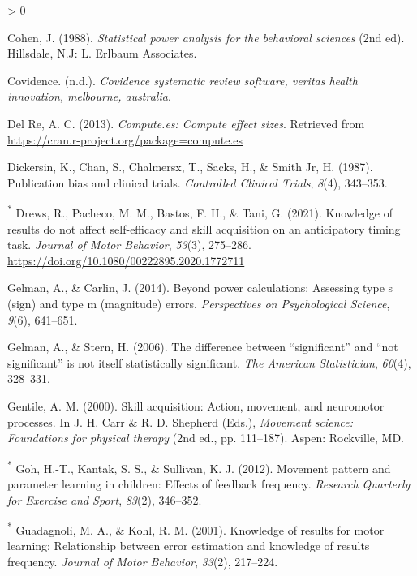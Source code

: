 \documentclass[
  english,
  man, donotrepeattitle,mask,floatsintext]{apa7}
\newlength{\cslhangindent}
\newenvironment{CSLReferences}[2] %
 {%
  \setlength{\parindent}{0pt}
  \ifodd #1 \everypar{\setlength{\hangindent}{\cslhangindent}}\ignorespaces\fi
  \ifnum #2 > 0
  \setlength{\parskip}{#2\baselineskip}
  \fi
 }%
 {}
\begin{document}
\begin{CSLReferences}{1}{0}
\leavevmode\hypertarget{ref-Cohen1988}{}%
Cohen, J. (1988). \emph{Statistical power analysis for the behavioral sciences} (2nd ed). Hillsdale, N.J: L. Erlbaum Associates.

\leavevmode\hypertarget{ref-Covidence}{}%
Covidence. (n.d.). \emph{Covidence systematic review software, veritas health innovation, melbourne, australia}.

\leavevmode\hypertarget{ref-DelRe2013}{}%
Del Re, A. C. (2013). \emph{Compute.es: Compute effect sizes}. Retrieved from \url{https://cran.r-project.org/package=compute.es}

\leavevmode\hypertarget{ref-Dickersin1987}{}%
Dickersin, K., Chan, S., Chalmersx, T., Sacks, H., \& Smith Jr, H. (1987). Publication bias and clinical trials. \emph{Controlled Clinical Trials}, \emph{8}(4), 343--353.

\leavevmode\hypertarget{ref-Drews2021}{}%
\textsuperscript{*} Drews, R., Pacheco, M. M., Bastos, F. H., \& Tani, G. (2021). Knowledge of results do not affect self-efficacy and skill acquisition on an anticipatory timing task. \emph{Journal of Motor Behavior}, \emph{53}(3), 275--286. \url{https://doi.org/10.1080/00222895.2020.1772711}

\leavevmode\hypertarget{ref-Gelman2014}{}%
Gelman, A., \& Carlin, J. (2014). Beyond power calculations: Assessing type s (sign) and type m (magnitude) errors. \emph{Perspectives on Psychological Science}, \emph{9}(6), 641--651.

\leavevmode\hypertarget{ref-Gelman2006}{}%
Gelman, A., \& Stern, H. (2006). The difference between {``significant''} and {``not significant''} is not itself statistically significant. \emph{The American Statistician}, \emph{60}(4), 328--331.

\leavevmode\hypertarget{ref-Gentile2000}{}%
Gentile, A. M. (2000). Skill acquisition: Action, movement, and neuromotor processes. In J. H. Carr \& R. D. Shepherd (Eds.), \emph{Movement science: Foundations for physical therapy} (2nd ed., pp. 111--187). Aspen: Rockville, MD.

\leavevmode\hypertarget{ref-Goh2012}{}%
\textsuperscript{*} Goh, H.-T., Kantak, S. S., \& Sullivan, K. J. (2012). Movement pattern and parameter learning in children: Effects of feedback frequency. \emph{Research Quarterly for Exercise and Sport}, \emph{83}(2), 346--352.

\leavevmode\hypertarget{ref-Guadagnoli2001}{}%
\textsuperscript{*} Guadagnoli, M. A., \& Kohl, R. M. (2001). Knowledge of results for motor learning: Relationship between error estimation and knowledge of results frequency. \emph{Journal of Motor Behavior}, \emph{33}(2), 217--224.


\end{CSLReferences}
\end{document}
